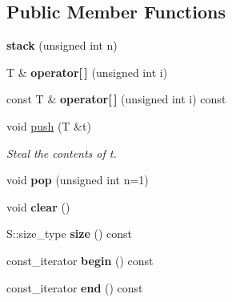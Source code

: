 \subsection*{Public Member Functions}
\begin{DoxyCompactItemize}
\item 
\hypertarget{classyy_1_1stack_af4277ae80177abc36f242c3646cbcfbe}{}{\bfseries stack} (unsigned int n)\label{classyy_1_1stack_af4277ae80177abc36f242c3646cbcfbe}

\item 
\hypertarget{classyy_1_1stack_a1058b8b7e1a3e0aa7b1e6f2f1a62c234}{}T \& {\bfseries operator\mbox{[}$\,$\mbox{]}} (unsigned int i)\label{classyy_1_1stack_a1058b8b7e1a3e0aa7b1e6f2f1a62c234}

\item 
\hypertarget{classyy_1_1stack_a46778e0ee1fd32a559008d5a261df098}{}const T \& {\bfseries operator\mbox{[}$\,$\mbox{]}} (unsigned int i) const \label{classyy_1_1stack_a46778e0ee1fd32a559008d5a261df098}

\item 
void \hyperlink{classyy_1_1stack_acf2b971ffb94c77b56fc0249b55250fa}{push} (T \&t)
\begin{DoxyCompactList}\small\item\em Steal the contents of {\itshape t}. \end{DoxyCompactList}\item 
\hypertarget{classyy_1_1stack_a0800c0a796cade80c3ce9a785dc87564}{}void {\bfseries pop} (unsigned int n=1)\label{classyy_1_1stack_a0800c0a796cade80c3ce9a785dc87564}

\item 
\hypertarget{classyy_1_1stack_ae8b2c8309dcdef98210205b1c96b2238}{}void {\bfseries clear} ()\label{classyy_1_1stack_ae8b2c8309dcdef98210205b1c96b2238}

\item 
\hypertarget{classyy_1_1stack_a16f628feeb98a5244ea914c94c160ac4}{}S\+::size\+\_\+type {\bfseries size} () const \label{classyy_1_1stack_a16f628feeb98a5244ea914c94c160ac4}

\item 
\hypertarget{classyy_1_1stack_a3939df081955a4ad78e14eeb9b2b5dbf}{}const\+\_\+iterator {\bfseries begin} () const \label{classyy_1_1stack_a3939df081955a4ad78e14eeb9b2b5dbf}

\item 
\hypertarget{classyy_1_1stack_a27ade5b933a4dc8a27960c88addda2a0}{}const\+\_\+iterator {\bfseries end} () const \label{classyy_1_1stack_a27ade5b933a4dc8a27960c88addda2a0}


\end{DoxyCompactItemize}
